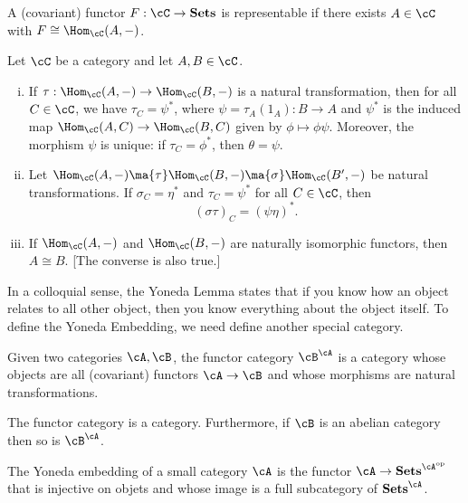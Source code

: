 \begin{dfn}[Representable]
A (covariant) functor $F: \cC \to \textbf{Sets}$ is representable if there exists $A \in \cC$ with $F \cong \Hom_\cC(A,-)$. 
\end{dfn}


\begin{cor}
Let $\cC$ be a category and let $A,B \in \cC$.
	\begin{enumerate}[(i)]
	\item If $\tau: \Hom_\cC(A,-) \to \Hom_\cC(B,-)$ is a natural transformation, then for all $C \in \cC$, we have $\tau_C= \psi^*$, where $\psi= \tau_A(1_A): B \to A$ and $\psi^*$ is the induced map $\Hom_\cC(A,C) \to \Hom_\cC(B,C)$ given by $\phi \mapsto \phi\psi$. Moreover, the morphism $\psi$ is unique: if $\tau_C=\phi^*$, then $\theta=\psi$.
	\item Let $\Hom_\cC(A,-) \ma{\tau} \Hom_\cC(B,-) \ma{\sigma} \Hom_\cC(B',-)$ be natural transformations. If $\sigma_C=\eta^*$ and $\tau_C=\psi^*$ for all $C \in \cC$, then 
		\[
		(\sigma\tau)_C=(\psi\eta)^*.
		\]
	\item If $\Hom_\cC(A,-)$ and $\Hom_\cC(B,-)$ are naturally isomorphic functors, then $A \cong B$. [The converse is also true.]
	\end{enumerate}
\end{cor}


In a colloquial sense, the Yoneda Lemma states that if you know how an object relates to all other object, then you know everything about the object itself. To define the Yoneda Embedding, we need define another special category. 


\begin{dfn}
Given two categories $\cA,\cB$, the functor category $\cB^{\cA}$ is a category whose objects are all (covariant) functors $\cA \rightarrow \cB$ and whose morphisms are natural transformations. 
\end{dfn}


\begin{prop}
The functor category is a category. Furthermore, if $\cB$ is an abelian category then so is $\cB^{\cA}$. 
\end{prop}


\begin{prop}
The Yoneda embedding of a small category $\cA$ is the functor $\cA \rightarrow \textbf{Sets}^{\cA^{\text{op}}}$ that is injective on objets and whose image is a full subcategory of $\textbf{Sets}^{\cA}$. 
\end{prop}

